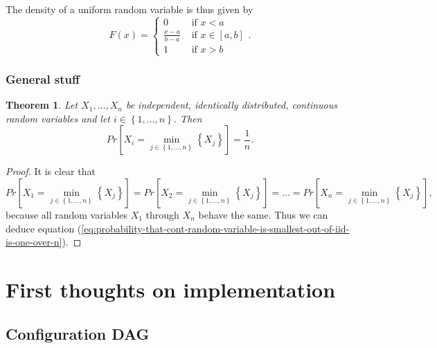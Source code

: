 \documentclass[letter]{report}
\newtheorem{theorem}{Theorem}[chapter]
\newcommand{\p}[1]{Pr\left[#1\right]}
\begin{document}
The density of a uniform random variable is thus given by
\begin{equation*}
  F(x) = \begin{cases}
    0 & \text{ if } x<a \\
    \frac{x-a}{b-a} & \text{ if } x\in\left[ a,b \right] \\
    1 & \text{ if } x>b
  \end{cases}.
\end{equation*}


\subsection{General stuff}
\label{sec:probability-misc}

\begin{theorem}
  Let $X_1,\dots,X_n$ be independent, identically distributed, continuous random variables and let $i\in\left\{ 1,\dots,n \right\}$. Then 
  \begin{equation}
    \label{eq:probability-that-cont-random-variable-is-smallest-out-of-iid-is-one-over-n}
    \p{X_i = \min_{j\in\left\{ 1,\dots,n \right\}}\left\{ X_j \right\}} = \frac{1}{n}.
  \end{equation}
\end{theorem}

\begin{proof}
  It is clear that 
  \begin{equation*}
    \p{X_1 = \min_{j\in\left\{ 1,\dots,n \right\}}\left\{ X_j \right\}} = \p{X_2 = \min_{j\in\left\{ 1,\dots,n \right\}}\left\{ X_j \right\}} = \dots = \p{X_n = \min_{j\in\left\{ 1,\dots,n \right\}}\left\{ X_j \right\}},
  \end{equation*}
  because all random variables $X_1$ through $X_n$ behave the same. Thus we can deduce equation (\ref{eq:probability-that-cont-random-variable-is-smallest-out-of-iid-is-one-over-n}).
\end{proof}

\chapter{First thoughts on implementation}
\label{chap:first-thoughts-on-implementation}

\section{Configuration DAG}
\label{sec:configuration-dag}
\end{document}
